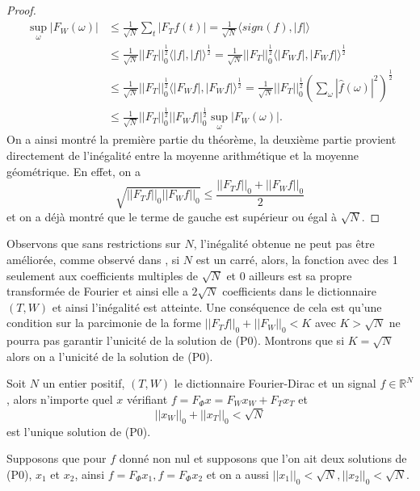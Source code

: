 \begin{exemple}
\begin{proof}
		\begin{align}
			\sup_\omega|F_W(\omega)| &\leq \frac{1}{\sqrt{N}}\sum_t |F_Tf (t)| = \frac{1}{\sqrt{N}}\langle sign(f), |f| \rangle \\
			&\leq  \frac{1}{\sqrt{N}} ||F_T||_0^{\frac{1}{2}} \langle |f|, |f| \rangle ^{\frac{1}{2}} =  \frac{1}{\sqrt{N}} ||F_T||_0^{\frac{1}{2}} \langle |F_W f|, |F_Wf| \rangle ^{\frac{1}{2}} \\
			&\leq   \frac{1}{\sqrt{N}} ||F_T||_0^{\frac{1}{2}} \langle |F_Wf|, |F_Wf| \rangle ^{\frac{1}{2}} =  \frac{1}{\sqrt{N}} ||F_T||_0^{\frac{1}{2}} \left( \sum_\omega|\hat{f}(\omega)|^2 \right)^{\frac{1}{2}}\\ 
			&\leq \frac{1}{\sqrt{N}}||F_T||_0^{\frac{1}{2}} ||F_W f||_0^{\frac{1}{2}} \sup_\omega |F_W(\omega)|.
		\end{align}
		On a ainsi montré la première partie du théorème, la deuxième partie provient directement de l'inégalité entre la moyenne arithmétique et la moyenne géométrique.
		En effet, on a 
		\begin{equation}
			\sqrt{||F_T f||_0 ||F_W f||_0} \leq \frac{||F_T f||_0 + ||F_W f||_0}{2}
		\end{equation}
	et on a déjà montré que le terme de gauche est supérieur ou égal à $\sqrt{N}$.
	\end{proof}
	Observons que sans restrictions sur $N$, l'inégalité obtenue ne peut pas être améliorée, comme observé dans \cite{donohostark} \cite{DonohoHuo}, si $N$ est un carré, alors, la fonction avec des 1 seulement aux coefficients multiples de $\sqrt{N}$ et 0 ailleurs est sa propre transformée de Fourier et ainsi elle a $2\sqrt{N}$ coefficients dans le dictionnaire $(T,W)$ et ainsi l'inégalité est atteinte.
	Une conséquence de cela est qu'une condition sur la parcimonie de la forme $||F_T f||_0 + ||F_W||_0 < K$ avec $K>\sqrt{N}$ ne pourra pas garantir l'unicité de la solution de (P0).
	Montrons que si $K = \sqrt{N}$ alors on a l'unicité de la solution de (P0).
	\begin{theoreme}\label{th:Incert2}
		Soit $N$ un entier positif, $(T,W)$ le dictionnaire Fourier-Dirac et un signal $f \in \mathbb{R}^N$, alors n'importe quel $x$ vérifiant $f = F_\Phi x = F_W x_W + F_T x_T$ et 
		\begin{equation}\label{eq:Incert1}
			||x_W||_0 + ||x_T||_0 < \sqrt{N}
		\end{equation}
		est l'unique solution de (P0).
	\end{theoreme}
	Supposons que pour $f$ donné non nul et supposons que l'on ait deux solutions de (P0), $x_1$ et $x_2$, ainsi $f = F_\Phi x_1, f = F_\Phi x_2$ et on a aussi $||x_1||_0 < \sqrt{N}, ||x_2||_0 < \sqrt{N}$.

\end{exemple}
